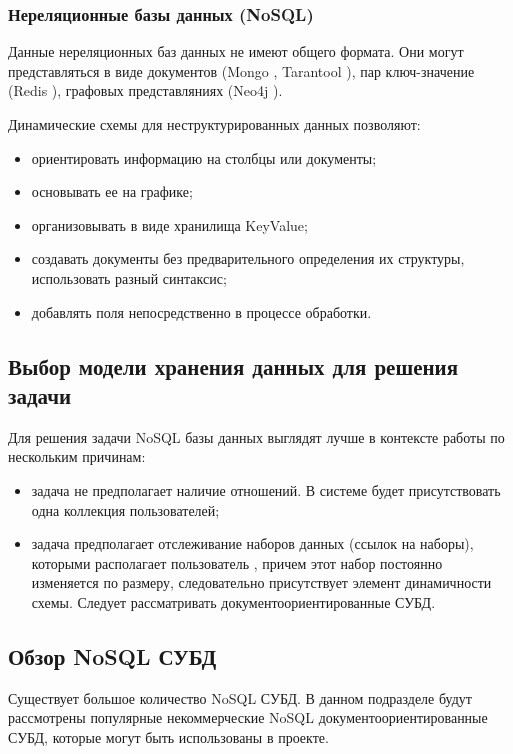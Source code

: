\subsubsection{Нереляционные базы данных (NoSQL)}

Данные нереляционных баз данных не имеют общего формата. Они могут представляться в виде документов (Mongo \cite{mongo}, Tarantool \cite{tarantool}), пар ключ-значение (Redis \cite{redis}), графовых представляниях (Neo4j \cite{neo4j}).

Динамические схемы для неструктурированных данных позволяют:

\begin{itemize}
	\item ориентировать информацию на столбцы или документы;
	\item основывать ее на графике;
	\item организовывать в виде хранилища KeyValue;
	\item создавать документы без предварительного определения их структуры, использовать разный синтаксис;
	\item добавлять поля непосредственно в процессе обработки.
\end{itemize}

\subsection{Выбор модели хранения данных для решения задачи}

Для решения задачи NoSQL базы данных выглядят лучше в контексте работы по нескольким причинам:

\begin{itemize}
	\item задача не предполагает наличие отношений. В системе будет присутствовать одна коллекция пользователей;
	\item задача предполагает отслеживание наборов данных (ссылок на наборы), которыми располагает пользователь , причем этот набор постоянно изменяется по размеру, следовательно присутствует элемент динамичности схемы. Следует рассматривать документоориентированные СУБД.
\end{itemize}

\subsection{Обзор NoSQL СУБД}

Существует большое количество NoSQL СУБД. В данном подразделе будут рассмотрены популярные некоммерческие NoSQL документоориентированные СУБД, которые могут быть использованы в проекте.

